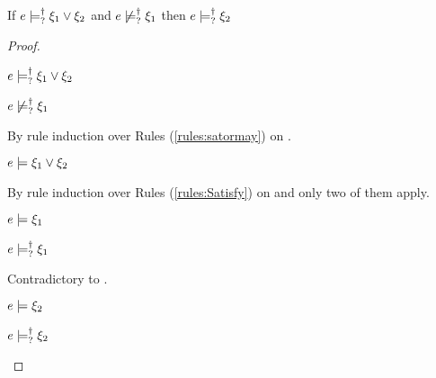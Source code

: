 \begin{lem}
  \label{lem:satisfy-substraction}
  If $e \models_{?}^{\dag} \xi_1 \vee \xi_2$ and $e \not\models_{?}^{\dag} \xi_1$ then $e \models_{?}^{\dag} \xi_2$
\end{lem}
\begin{proof}
  \begin{pfsteps*}
  \item $e \models_{?}^{\dag} \xi_1 \vee \xi_2$  
  \item $e \not\models_{?}^{\dag} \xi_1$  
  \end{pfsteps*}
  By rule induction over Rules (\ref{rules:satormay}) on .
  \begin{byCases}
  \item[\text{(\ref{rule:CMSMust})}]
    \begin{pfsteps*}
    \item $e \models \xi_1 \vee \xi_2$  
    \end{pfsteps*}
    By rule induction over Rules (\ref{rules:Satisfy}) on  and only two of them apply.
    \begin{byCases}
    \item[\text{(\ref{rule:CSOr1})}]
      \begin{pfsteps*}
      \item $e \models \xi_1$  
      \item $e \models_{?}^{\dag} \xi_1$ 
      \end{pfsteps*}
      Contradictory to .
    \item[\text{(\ref{rule:CSOr2})}]
      \begin{pfsteps*}
      \item $e \models \xi_2$  
      \item $e \models_{?}^{\dag} \xi_2$ 
      \end{pfsteps*}
    \end{byCases}


\end{byCases}
\end{proof}
